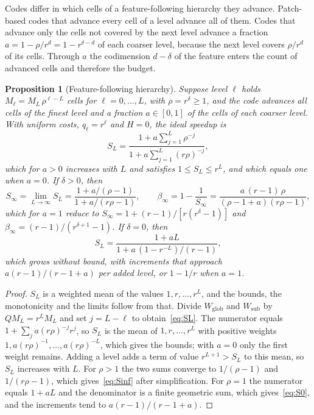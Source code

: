\documentclass[12pt]{article}
\newtheorem{proposition}{Proposition}
\theoremstyle{remark}
\newcommand{\WG}{W_{\mathrm{glob}}}
\newcommand{\WL}{W_{\mathrm{sub}}}
\begin{document}
Codes differ in which cells of a feature-following hierarchy they advance. Patch-based codes that advance every cell of a level advance all of them. Codes that advance only the cells not covered by the next level advance a fraction $a=1-\rho/r^d=1-r^{\delta-d}$ of each coarser level, because the next level covers $\rho/r^d$ of its cells. Through $a$ the codimension $d-\delta$ of the feature enters the count of advanced cells and therefore the budget.

\begin{proposition}[Feature-following hierarchy]\label{prop:geom}
Suppose level $\ell$ holds $M_\ell=M_L\,\rho^{\ell-L}$ cells for $\ell=0,\dots,L$, with $\rho=r^\delta\ge1$, and the code advances all cells of the finest level and a fraction $a\in[0,1]$ of the cells of each coarser level. With uniform costs, $q_\ell=r^\ell$ and $H=0$, the ideal speedup is
\begin{equation}\label{eq:SL}
S_L=\frac{1+a\sum_{j=1}^{L}\rho^{-j}}{1+a\sum_{j=1}^{L}(r\rho)^{-j}},
\end{equation}
which for $a>0$ increases with $L$ and satisfies $1\le S_L\le r^L$, and which equals one when $a=0$. If $\delta>0$, then
\begin{equation}\label{eq:Sinf}
S_\infty=\lim_{L\to\infty}S_L=\frac{1+a/(\rho-1)}{1+a/(r\rho-1)},\qquad
\beta_\infty=1-\frac{1}{S_\infty}=\frac{a\,(r-1)\,\rho}{(\rho-1+a)(r\rho-1)},
\end{equation}
which for $a=1$ reduce to $S_\infty=1+(r-1)/[r(r^\delta-1)]$ and $\beta_\infty=(r-1)/(r^{\delta+1}-1)$. If $\delta=0$, then
\begin{equation}\label{eq:S0}
S_L=\frac{1+aL}{1+a\,(1-r^{-L})/(r-1)},
\end{equation}
which grows without bound, with increments that approach $a(r-1)/(r-1+a)$ per added level, or $1-1/r$ when $a=1$.
\end{proposition}

\begin{proof}
$S_L$ is a weighted mean of the values $1,r,\dots,r^L$, and the bounds, the monotonicity and the limits follow from that. Divide $\WG$ and $\WL$ by $QM_L=r^LM_L$ and set $j=L-\ell$ to obtain~\eqref{eq:SL}. The numerator equals $1+\sum_j a(r\rho)^{-j}r^j$, so $S_L$ is the mean of $1,r,\dots,r^L$ with positive weights $1,a(r\rho)^{-1},\dots,a(r\rho)^{-L}$, which gives the bounds; with $a=0$ only the first weight remains. Adding a level adds a term of value $r^{L+1}>S_L$ to this mean, so $S_L$ increases with $L$. For $\rho>1$ the two sums converge to $1/(\rho-1)$ and $1/(r\rho-1)$, which gives~\eqref{eq:Sinf} after simplification. For $\rho=1$ the numerator equals $1+aL$ and the denominator is a finite geometric sum, which gives~\eqref{eq:S0}, and the increments tend to $a(r-1)/(r-1+a)$.
\end{proof}
\end{document}
